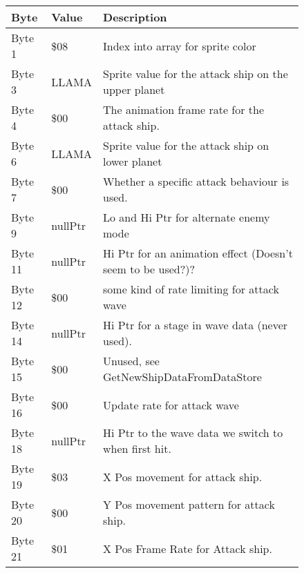\begin{figure}[H]
  {
  \setlength{\tabcolsep}{3.0pt}
  \setlength\cmidrulewidth{\heavyrulewidth} %
  \begin{adjustbox}{width=12cm}

\begin{tabular}{lll}
\toprule
 Byte    & Value              & Description                                                        \\
\midrule
 Byte 1  & \$08                & Index into array for sprite color                                  \\
 Byte 3  & LLAMA              & Sprite value for the attack ship on the upper planet               \\
 Byte 4  & \$00                & The animation frame rate for the attack ship.                      \\
 Byte 6  & LLAMA              & Sprite value for the attack ship on lower planet                   \\
 Byte 7  & \$00                & Whether a specific attack behaviour is used.                       \\
 Byte 9  & nullPtr            & Lo and Hi Ptr for alternate enemy mode                             \\
 Byte 11 & nullPtr            & Hi Ptr for an animation effect (Doesn't seem to be used?)?         \\
 Byte 12 & \$00                & some kind of rate limiting for attack wave                         \\
 Byte 14 & nullPtr            & Hi Ptr for a stage in wave data (never used).                      \\
 Byte 15 & \$00                & Unused, see GetNewShipDataFromDataStore                            \\
 Byte 16 & \$00                & Update rate for attack wave                                        \\
 Byte 18 & nullPtr            & Hi Ptr to the wave data we switch to when first hit.               \\
 Byte 19 & \$03                & X Pos movement for attack ship.                                    \\
 Byte 20 & \$00                & Y Pos movement pattern for attack ship.                            \\
 Byte 21 & \$01                & X Pos Frame Rate for Attack ship.                                  \\

\end{tabular}
\end{adjustbox}}
\end{figure}

